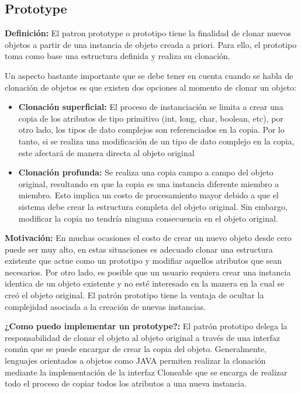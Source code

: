 \subsection{Prototype}

\textbf{Definición:} El patron prototype o prototipo tiene la finalidad de clonar nuevos objetos a partir de una instancia de objeto creada a priori. Para ello, el prototipo toma como base una estructura definida y realiza su clonación.

Un aspecto bastante importante que se debe tener en cuenta cuando se habla de clonación de objetos es que existen dos opciones al momento de clonar un objeto:

\begin{itemize}
	\item \textbf{Clonación superficial:} El proceso de instanciación se limita a crear una copia de los atributos de tipo primitivo (int, long, char, boolean, etc), por otro lado, los tipos de dato complejos son referenciados en la copia. Por lo tanto, si se realiza una modificación de un tipo de dato complejo en la copia, este afectará de manera directa al objeto original
	\item \textbf{Clonación profunda:} Se realiza una copia campo a campo del objeto original, resultando en que la copia es una instancia diferente miembro a miembro. Esto implica un costo de procesamiento mayor debido a que el sistema debe crear la estructura completa del objeto original. Sin embargo, modificar la copia no tendría ninguna consecuencia en el objeto original.
\end{itemize}


\textbf{Motivación:} En muchas ocasiones el costo de crear un nuevo objeto desde cero puede ser muy alto, en estas situaciones es adecuado clonar una estructura existente que actue como un prototipo y modifiar aquellos atributos que sean necesarios. Por otro lado, es posible que un usuario requiera crear una instancia identica de un objeto existente y no esté interesado en la manera en la cual se creó el objeto original. El patrón prototipo tiene la ventaja de ocultar la complejidad asociada a la creación de nuevas instancias.

\textbf{¿Como puedo implementar un prototype?:} El patrón prototipo delega la responsabilidad de clonar el objeto al objeto original a través de una interfaz común que se puede encargar de crear la copia del objeto. Generalmente, lenguajes orientados a objetos como JAVA permiten realizar la clonación mediante la implementación de la interfaz Cloneable que se encarga de realizar todo el proceso de copiar todos los atributos a una nueva instancia.

